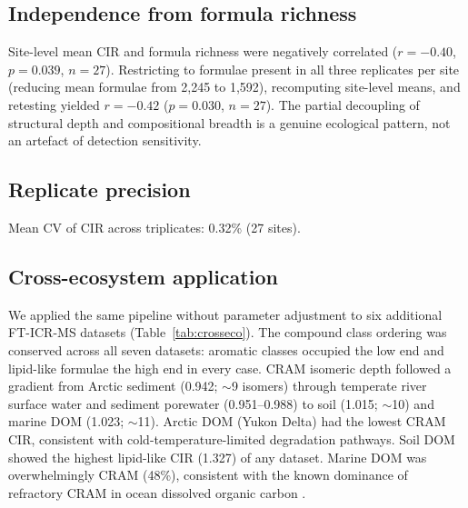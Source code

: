 \documentclass[12pt,letterpaper]{article}
\begin{document}
\subsection{Independence from formula richness}

Site-level mean CIR and formula richness were negatively correlated ($r = -0.40$, $p = 0.039$, $n = 27$). Restricting to formulae present in all three replicates per site (reducing mean formulae from 2,245 to 1,592), recomputing site-level means, and retesting yielded $r = -0.42$ ($p = 0.030$, $n = 27$). The partial decoupling of structural depth and compositional breadth is a genuine ecological pattern, not an artefact of detection sensitivity.

\subsection{Replicate precision}

Mean CV of CIR across triplicates: 0.32\% (27 sites).

\subsection{Cross-ecosystem application}

We applied the same pipeline without parameter adjustment to six additional FT-ICR-MS datasets (Table~\ref{tab:crosseco}). The compound class ordering was conserved across all seven datasets: aromatic classes occupied the low end and lipid-like formulae the high end in every case. CRAM isomeric depth followed a gradient from Arctic sediment (0.942; $\sim$9 isomers) through temperate river surface water and sediment porewater (0.951--0.988) to soil (1.015; $\sim$10) and marine DOM (1.023; $\sim$11). Arctic DOM (Yukon Delta) had the lowest CRAM CIR, consistent with cold-temperature-limited degradation pathways. Soil DOM showed the highest lipid-like CIR (1.327) of any dataset. Marine DOM was overwhelmingly CRAM (48\%), consistent with the known dominance of refractory CRAM in ocean dissolved organic carbon \citep{hertkorn2006}.
\end{document}
